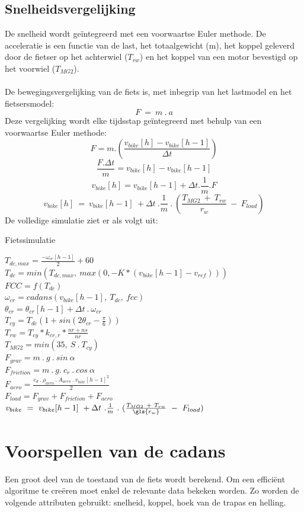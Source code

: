 \subsection*{Snelheidsvergelijking}
\noindent De snelheid wordt geïntegreerd met een voorwaartse Euler methode. De acceleratie is een functie van de last, het totaalgewicht (m), het koppel geleverd door de fietser op het achterwiel ($T_{rw}$) en het koppel van een motor bevestigd op het voorwiel ($T_{MG2}$). 
\\\\
De bewegingsvergelijking van de fiets is, met inbegrip van het lastmodel en het fietsersmodel:
\[F \ = \  m \ . \ a \]
Deze vergelijking wordt elke tijdsstap geïntegreerd met behulp van een voorwaartse Euler methode:
\[F = m.(\frac{v_{bike}[h]-v_{bike}[h-1]}{\Delta t})\]
\[ \frac{F.\Delta t}{m}=v_{bike}[h]-v_{bike}[h-1]\]
\[v_{bike}[h]=v_{bike}[h-1]+\Delta t .\frac{1}{m}.F\]
\[v_{bike}[h] \ = \ v_{bike}[h-1] \ + \Delta t  \ . \frac{1}{m} \ . \ (\frac{T_{MG2} \ + \ T_{rw}}{r_w} \ - \ F_{load})\]
\newpage
De volledige simulatie ziet er als volgt uit:
\begin{algorithm}
\caption*{Fietssimulatie}
{
$T_{dc,max} = \frac{-\omega_{cr}[h-1]}{2}+60$\\
$T_{dc} = min(T_{dc,max}, \ max(0,-K*(v_{bike}[h-1]-v_{ref})))$\\
$FCC = f(T_{dc})$\\
$\omega_{cr}=cadans(v_{bike}[h-1], \ T_{dc}, \ fcc)$\\
$\theta_{cr}=\theta_{cr}[h-1] + \Delta t \ . \ \omega_{cr}$ \\
$T_{cy} = T_{dc}(1+sin(2\theta_{cr}-\frac{\pi}{6}))$\\
$T_{rw}=T_{cy}*k_{cr,r}*\frac{nr+ns}{nr}$\\
$T_{MG2}=min(35, \ S \ . \ T_{cy})$\\
$F_{grav}=m \ . \ g \ . \ sin \ \alpha$\\
$F_{friction}=m \ . \ g. \ c_r \ . \ cos \ \alpha$\\
$F_{aero}=\frac{c_d \ . \ \rho_{aero} \ . \ A_{aero} \ . \ v_{bike}[h-1]^2}{2}$\\
$F_{load} = F_{grav}+F_{friction}+F_{aero}$\\
$v_{bike} \ = \ v_{bike}[h-1] \ + \Delta t  \ . \frac{1}{m} \ . \ (\frac{T_{MG2} \ + \ T_{rw}}{\gls{r_w}} \ - \ F_{load})$
}
\end{algorithm}

\section{Voorspellen van de cadans}
Een groot deel van de toestand van de fiets wordt berekend. Om een efficiënt algoritme te creëren moet enkel de relevante data bekeken worden. Zo worden de volgende attributen gebruikt: snelheid, koppel, hoek van de trapas en helling. 
\\

